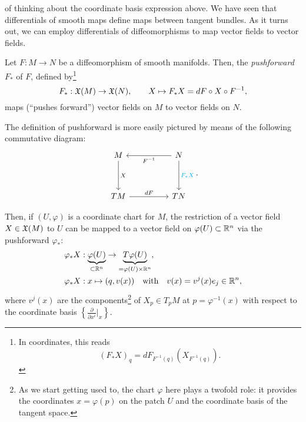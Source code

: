  of thinking about the coordinate basis expression above.
We have seen that differentials of smooth maps define maps between tangent bundles.
As it turns out, we can employ differentials of diffeomorphisms to map vector fields to vector fields.

\begin{definition}
  Let $F:M\to N$ be a diffeomorphism of smooth manifolds.
  Then, the \emph{pushforward} $F_*$ of $F$, defined by\footnote{In coordinates, this reads\begin{equation}
      (F_* X)_q = dF_{F^{-1}(q)}(X_{F^{-1}(q)}).
    \end{equation}}
  \begin{equation}\label{eq:pfvf}
    F_*: \mathfrak{X}(M) \to \mathfrak{X}(N),\qquad
    X \mapsto F_* X = d F \circ X \circ F^{-1},
  \end{equation}
  maps (``pushes forward'') vector fields on $M$ to vector fields on $N$.
\end{definition}

The definition of pushforward is more easily pictured by means of the following commutative diagram:
\begin{equation}
  \begin{tikzcd}[row sep=huge, column sep=huge]
    M \arrow[d, "X"]
    & N \arrow[l, "F^{-1}"] \arrow[d, "F_*X" cyan]\\
    TM \arrow[r, "d F"]
    & TN
  \end{tikzcd}.
\end{equation}

Then, if $(U, \varphi)$ is a coordinate chart for $M$, the restriction of a vector field $X\in\mathfrak{X}(M)$ to $U$ can be mapped to a vector field on $\varphi(U)\subset\mathbb{R}^n$ via the pushforward $\varphi_*$:
\begin{align}
  \varphi_* X & : \LaTeXunderbrace{\varphi(U)}_{\subset\R^n} \to \LaTeXunderbrace{T \varphi(U)}_{=\varphi(U)\times\R^n}, \\
  \varphi_* X & : x\mapsto (q,v(x)) \quad\mbox{with}\quad v(x) = v^j(x)e_j \in \R^n,
\end{align}
where $v^j(x)$ are the components\footnote{As we start getting used to, the chart $\varphi$ here plays a twofold role: it provides the coordinates $x=\varphi(p)$ on the patch $U$ and the coordinate basis of the tangent space.} of $X_p\in T_p M$ at $p=\varphi^{-1}(x)$ with respect to the coordinate basis $\left\{\frac{\partial}{\partial x^i}\big|_x\right\}$.

